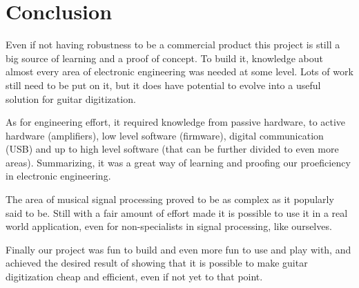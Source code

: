 \chapter[Conclusion]{Conclusion}
Even if not having robustness to be a commercial product this project is still a big source
of learning and a proof of concept. To build it, knowledge about almost every area
of electronic engineering was needed at some level. Lots of work still need to be put on it,
but it does have potential to evolve into a useful solution for guitar digitization.

As for engineering effort, it required knowledge from passive hardware, to active hardware
(amplifiers), low level software (firmware), digital communication (USB) and up to high
level software (that can be further divided to even more areas). Summarizing, it was
a great way of learning and proofing our proeficiency in electronic engineering.

The area of musical signal processing proved to be as complex as it popularly said to be.
Still with a fair amount of effort made it is possible to use it in a real world application,
even for non-specialists in signal processing, like ourselves.

Finally our project was fun to build and even more fun to use and play with, and achieved
the desired result of showing that it is possible to make guitar digitization cheap and
efficient, even if not yet to that point.